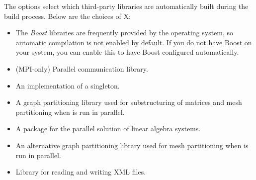 The  options select which third-party libraries are
automatically built during the \nekpp build process. Below are the choices of X:
\begin{itemize}
    \item {}

    The \emph{Boost} libraries are frequently provided by the operating system,
    so automatic compilation is not enabled by default. If you do not have
    Boost on your system, you can enable this to have Boost configured
    automatically.

    \item {}
    
    (MPI-only) Parallel communication library.
    
    \item {}
    
    An implementation of a singleton.
    
    \item {}
    
    A graph partitioning library used for substructuring of matrices and mesh
    partitioning when \nekpp is run in parallel.

    \item {}

    A package for the parallel solution of linear algebra systems.

    \item {}

    An alternative graph partitioning library used for mesh partitioning when
    \nekpp is run in parallel.

    \item {}
    
    Library for reading and writing XML files.
\end{itemize}

